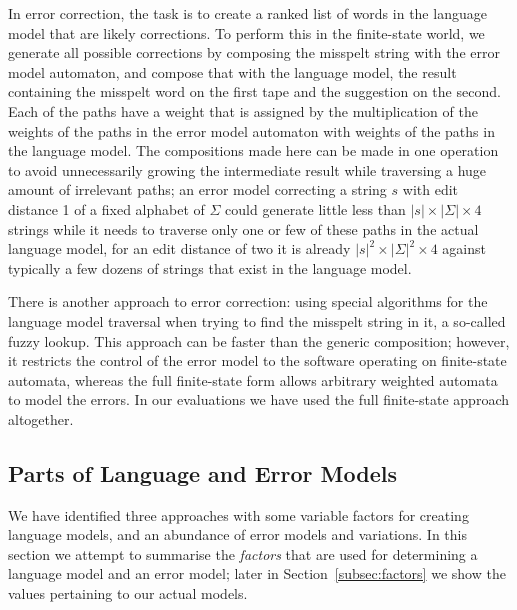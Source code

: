 \documentclass[a4paper,12pt]{article}
\begin{document}
In error correction, the task is to create a ranked list of words in the
language model that are likely corrections. To perform this in the finite-state
world, we generate all possible corrections by composing the misspelt string
with the error model automaton, and compose that with the language model, the
result containing the misspelt word on the first tape and the suggestion on the
second. Each of the paths have a weight that is assigned by the multiplication
of the weights of the paths in the error model automaton with weights of the
paths in the language model. The compositions made here can be made in one
operation~\cite[]{hfst/2012/cla} to avoid unnecessarily growing the
intermediate result while traversing a huge amount of irrelevant paths; an
error model correcting a string $s$ with edit distance 1 of a fixed alphabet of
$\Sigma$ could generate little less than $|s| \times |\Sigma| \times 4$ strings
while it needs to traverse only one or few of these paths in the actual
language model, for an edit distance of two it is already $|s|^2 \times
|\Sigma|^2 \times 4$ against typically a few dozens of strings that exist in
the language model.

There is another approach to error correction: using special algorithms
for the language model traversal when trying to find the misspelt string in it,
a so-called fuzzy lookup. This approach can be faster than the generic
composition; however, it restricts the control of the error model to the
software operating on finite-state automata, whereas the full finite-state form
allows arbitrary weighted automata to model the errors. In our evaluations we
have used the full finite-state approach altogether.

\subsection{Parts of Language and Error Models}
\label{subsec:summary}

We have identified three approaches with some variable factors for creating
language models, and an abundance of error models and variations. In this
section we attempt to summarise the \emph{factors} that are used for
determining a language model and an error model; later in
Section~\ref{subsec:factors} we show the values pertaining to our actual
models.
\end{document}
